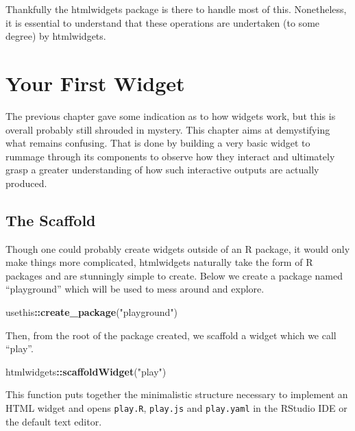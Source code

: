 \documentclass[10pt,]{krantz}
\makeatletter
\newenvironment{Shaded}{\begin{snugshade}}{\end{snugshade}}
\newcommand{\KeywordTok}[1]{\textcolor[rgb]{0.27,0.27,0.27}{\textbf{#1}}}
\newcommand{\NormalTok}[1]{#1}
\newcommand{\OperatorTok}[1]{\textcolor[rgb]{0.43,0.43,0.43}{\textbf{#1}}}
\newcommand{\StringTok}[1]{\textcolor[rgb]{0.5,0.5,0.5}{#1}}
\newenvironment{kframe}{%
\medskip{}
\setlength{\fboxsep}{.8em}
 \def\at@end@of@kframe{}%
 \ifinner\ifhmode%
  \def\at@end@of@kframe{\end{minipage}}%
  \begin{minipage}{\columnwidth}%
 \fi\fi%
 \def\FrameCommand##1{\hskip\@totalleftmargin \hskip-\fboxsep
 \colorbox{shadecolor}{##1}\hskip-\fboxsep
     \hskip-\linewidth \hskip-\@totalleftmargin \hskip\columnwidth}%
 \MakeFramed {\advance\hsize-\width
   \@totalleftmargin\z@ \linewidth\hsize
   \@setminipage}}%
 {\par\unskip\endMakeFramed%
 \at@end@of@kframe}
\renewenvironment{Shaded}{\begin{kframe}}{\end{kframe}}
\makeatother
\begin{document}
Thankfully the htmlwidgets package is there to handle most of this. Nonetheless, it is essential to understand that these operations are undertaken (to some degree) by htmlwidgets.

\hypertarget{widgets-first}{%
\chapter{Your First Widget}\label{widgets-first}}

The previous chapter gave some indication as to how widgets work, but this is overall probably still shrouded in mystery. This chapter aims at demystifying what remains confusing. That is done by building a very basic widget to rummage through its components to observe how they interact and ultimately grasp a greater understanding of how such interactive outputs are actually produced.

\hypertarget{widgets-first-scaffold}{%
\section{The Scaffold}\label{widgets-first-scaffold}}

Though one could probably create widgets outside of an R package, it would only make things more complicated, htmlwidgets naturally take the form of R packages and are stunningly simple to create. Below we create a package named ``playground'' which will be used to mess around and explore.

\begin{Shaded}
\begin{Highlighting}[]
\NormalTok{usethis}\OperatorTok{::}\KeywordTok{create_package}\NormalTok{(}\StringTok{"playground"}\NormalTok{)}
\end{Highlighting}
\end{Shaded}

Then, from the root of the package created, we scaffold a widget which we call ``play''.

\begin{Shaded}
\begin{Highlighting}[]
\NormalTok{htmlwidgets}\OperatorTok{::}\KeywordTok{scaffoldWidget}\NormalTok{(}\StringTok{"play"}\NormalTok{)}
\end{Highlighting}
\end{Shaded}

This function puts together the minimalistic structure necessary to implement an HTML widget and opens \texttt{play.R}, \texttt{play.js} and \texttt{play.yaml} in the RStudio IDE or the default text editor.
\end{document}

